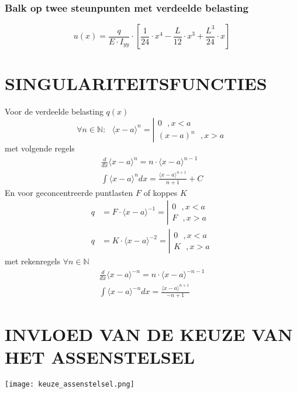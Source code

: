             \subsubsection{Balk op twee steunpunten met verdeelde belasting}

                \begin{equation}
                    u(x) = \frac{q}{E\cdot I_{yy}}\cdot\left[\frac{1}{24}\cdot x^4 - \frac{L}{12}\cdot x^3 + \frac{L^3}{24}\cdot x\right]
                \end{equation}

    \section{SINGULARITEITSFUNCTIES}

        Voor de verdeelde belasting $q(x)$
        \begin{equation}
            \forall n\in \mathbb{N}: \:\:\: \langle x-a\rangle^n = \left|\begin{matrix}
                0 \:\:\:, x<a\\
                (x-a)^n \:\:\:, x>a
            \end{matrix}\right.
        \end{equation}
        met volgende regels
        \begin{align}
            \frac{d}{dx}\langle x-a\rangle^n = n\cdot\langle x-a\rangle^{n-1}\nonumber\\
            \int\langle x-a\rangle^ndx = \frac{\langle x-a\rangle^{n+1}}{n+1} + C
        \end{align}
        En voor geconcentreerde puntlasten $F$ of koppes $K$
        \begin{align}
            q &= F\cdot\langle x-a\rangle^{-1} = \left|\begin{matrix}
                0 \:\:\:, x<a\\
                F \:\:\:, x>a
            \end{matrix}\right.\nonumber\\
            q &= K\cdot\langle x-a\rangle^{-2} = \left|\begin{matrix}
                0 \:\:\:, x<a\\
                K \:\:\:, x>a
            \end{matrix}\right.
        \end{align}
        met rekenregels $\forall n \in \mathbb{N}$
        \begin{align}
            \frac{d}{dx}\langle x-a\rangle^{-n} = n\cdot\langle x-a\rangle^{-n-1}\nonumber\\
            \int\langle x-a\rangle^{-n}dx = \frac{\langle x-a\rangle^{n+1}}{-n+1}
        \end{align}

    \section{INVLOED VAN DE KEUZE VAN HET ASSENSTELSEL}

        \begin{center}
            \texttt{[image: keuze\_assenstelsel.png]}
        \end{center}

        

            